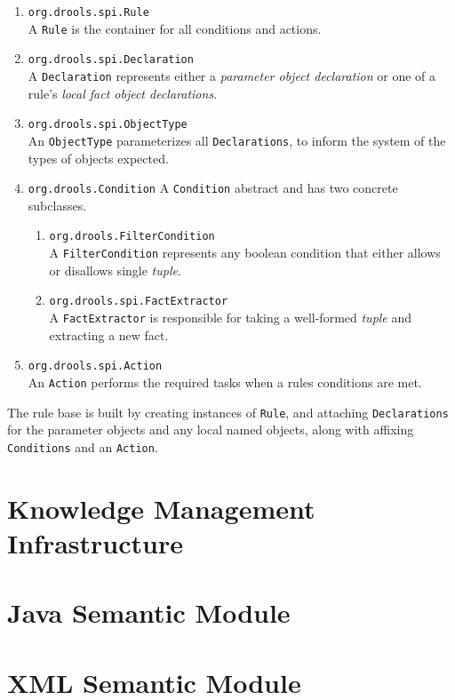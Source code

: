 \documentclass[10pt,twocolumn,letterpaper]{article}
\begin{document}
\begin{enumerate}
	\item \verb|org.drools.spi.Rule|\\
		A \verb|Rule| is the container for all conditions and
		actions.
	\item \verb|org.drools.spi.Declaration|\\
		A \verb|Declaration| represents either a
		\emph{parameter object declaration} or one of a
		rule's \emph{local fact object declarations}.
	\item \verb|org.drools.spi.ObjectType|\\
		An \verb|ObjectType| parameterizes all \verb|Declarations|,
		to inform the system of the types of objects expected.
	\item \verb|org.drools.Condition|
		A \verb|Condition| abstract and has two concrete
		subclasses.
		\begin{enumerate}
			\item \verb|org.drools.FilterCondition|\\
			A \verb|FilterCondition| represents any boolean
			condition that either allows or disallows single
			\emph{tuple}.
			\item \verb|org.drools.spi.FactExtractor|\\
			A \verb|FactExtractor| is responsible
			for taking a well-formed \emph{tuple} and 
			extracting a new fact.
		\end{enumerate}
	\item \verb|org.drools.spi.Action|\\
		An \verb|Action| performs the required tasks when 
		a rules conditions are met.
\end{enumerate}

The rule base is built by creating instances of \verb|Rule|, 
and attaching \verb|Declarations| for the parameter objects and any
local named objects, along with affixing \verb|Conditions|
and an \verb|Action|.

\section{Knowledge Management\\Infrastructure}

\section{Java Semantic Module}

\section{XML Semantic Module}



\end{document}
